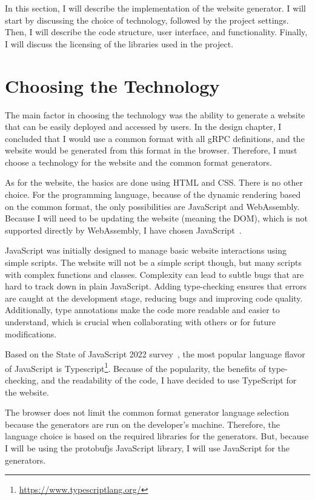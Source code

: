 In this section, I will describe the implementation of the website generator.
I will start by discussing the choice of technology, followed by the project settings.
Then, I will describe the code structure, user interface, and functionality.
Finally, I will discuss the licensing of the libraries used in the project.


\section{Choosing the Technology}
The main factor in choosing the technology was the ability to generate a website that can be easily deployed and accessed by users.
In the design chapter, I concluded that I would use a common format with all gRPC definitions, and the website would be generated from this format in the browser.
Therefore, I must choose a technology for the website and the common format generators.

As for the website, the basics are done using HTML and CSS\@.
There is no other choice.
For the programming language, because of the dynamic rendering based on the common format, the only possibilities are JavaScript and WebAssembly.
Because I will need to be updating the website (meaning the DOM), which is not supported directly by WebAssembly, I have chosen JavaScript~\cite{webassembly-dom}.

JavaScript was initially designed to manage basic website interactions using simple scripts.
The website will not be a simple script though, but many scripts with complex functions and classes.
Complexity can lead to subtle bugs that are hard to track down in plain JavaScript.
Adding type-checking ensures that errors are caught at the development stage, reducing bugs and improving code quality.
Additionally, type annotations make the code more readable and easier to understand, which is crucial when collaborating with others or for future modifications.
\cite{typescript-why-create}

Based on the State of JavaScript 2022 survey~\cite{state-of-js-other-tools}, the most popular language flavor of JavaScript is Typescript\footnote{\url{https://www.typescriptlang.org/}}.
Because of the popularity, the benefits of type-checking, and the readability of the code, I have decided to use TypeScript for the website.

The browser does not limit the common format generator language selection because the generators are run on the developer's machine.
Therefore, the language choice is based on the required libraries for the generators.
But, because I will be using the protobufjs JavaScript library, I will use JavaScript for the generators.

